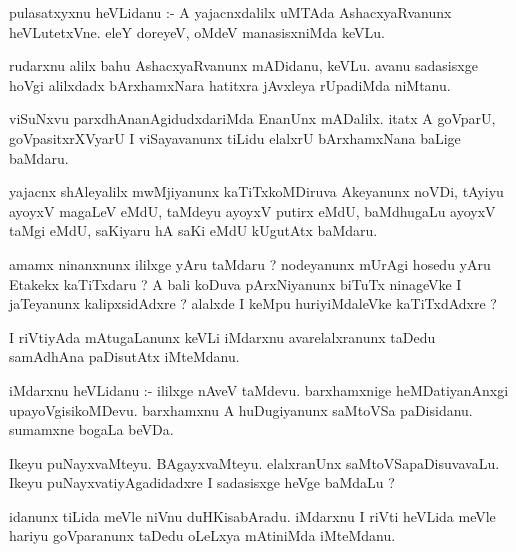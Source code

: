 \documentclass{article}
\begin{document}
\begin{mn}
pulasatxyxnu heVLidanu :- A yajacnxdalilx uMTAda AshacxyaRvanunx heVLutetxVne.  
eleY doreyeV,  oMdeV manasisxniMda keVLu.
\end{mn}

\begin{mn}
rudarxnu alilx bahu AshacxyaRvanunx  mADidanu, keVLu.  avanu sadasisxge hoVgi alilxdadx 
bArxhamxNara hatitxra jAvxleya rUpadiMda niMtanu.
\end{mn}

\begin{mn}
viSuNxvu parxdhAnanAgidudxdariMda  EnanUnx  mADalilx.  itatx A goVparU,  goVpasitxrXVyarU 
I viSayavanunx  tiLidu  elalxrU bArxhamxNana baLige baMdaru. 
\end{mn}

\begin{mn}
yajacnx shAleyalilx mwMjiyanunx  kaTiTxkoMDiruva  Akeyanunx  noVDi,  tAyiyu ayoyxV  magaLeV  eMdU,   
taMdeyu  ayoyxV  putirx  eMdU, baMdhugaLu  ayoyxV taMgi eMdU, saKiyaru hA saKi eMdU kUgutAtx baMdaru. 
\end{mn}

\begin{mn}
amamx ninanxnunx ililxge yAru taMdaru ?  nodeyanunx mUrAgi hosedu yAru Etakekx kaTiTxdaru ?  A bali koDuva 
pArxNiyanunx  biTuTx ninageVke I jaTeyanunx kalipxsidAdxre ?  alalxde I keMpu  huriyiMdaleVke  kaTiTxdAdxre ?
\end{mn}

\begin{mn}
I riVtiyAda mAtugaLanunx keVLi iMdarxnu avarelalxranunx taDedu samAdhAna paDisutAtx  iMteMdanu. 
\end{mn}

\begin{mn}
iMdarxnu heVLidanu :- ililxge nAveV taMdevu. barxhamxnige heMDatiyanAnxgi upayoVgisikoMDevu.  
barxhamxnu  A huDugiyanunx  saMtoVSa paDisidanu.  sumamxne bogaLa beVDa.
\end{mn}

\begin{mn}
Ikeyu puNayxvaMteyu.  BAgayxvaMteyu.  elalxranUnx  saMtoVSapaDisuvavaLu.  
Ikeyu puNayxvatiyAgadidadxre  I sadasisxge heVge baMdaLu ?
\end{mn}

\begin{mn}
idanunx tiLida meVle niVnu duHKisabAradu.  iMdarxnu I riVti heVLida meVle hariyu  goVparanunx  
taDedu oLeLxya  mAtiniMda  iMteMdanu.
\end{mn}
\end{document}
